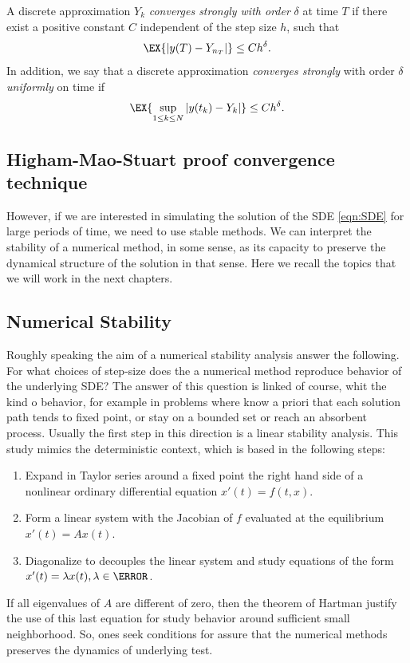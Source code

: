 \begin{definition}[order]
	A discrete approximation $Y_k$ \emph{converges strongly with order} $\delta$ at time $T$ if there exist a positive 
	constant $C$ independent of the step size $h$, such that
	\begin{equation}
	\EX{|y(T)-Y_{n_T}|} \leq C h^\delta.
	\end{equation}
	In addition, we say that a discrete approximation \emph{converges strongly} with order $\delta$ \emph{uniformly} on
	 time if
	\begin{equation}
	\EX{
		\sup_{1 \leq k\leq N}
		|y(t_k)-Y_k|
	}\leq C h^{\delta}.
	\end{equation}
\end{definition}


\subsection{Higham-Mao-Stuart proof convergence technique}
	
	However, if we are interested in simulating the  solution of the SDE \eqref{eqn:SDE} for large periods of time, 
	we need to use stable methods. We can interpret the stability of a numerical method, in some sense, as its
	capacity to preserve the  dynamical structure of the solution in that sense. Here we recall the topics that we will 
	work in the next chapters.
\subsection{Numerical Stability}
		Roughly speaking the aim of a numerical stability analysis answer the following.
	For what choices of step-size does the a numerical method reproduce behavior of the underlying SDE?
	The answer of this question is linked of course, whit the kind o behavior, for example in problems where know a 
	priori that	each solution path tends to fixed point, or stay on a bounded set or reach an absorbent process.
	Usually the first step in this direction is a linear stability analysis. This study mimics the deterministic 
	context, which is based in the following steps:
	\begin{enumerate}
		\item 
			Expand in Taylor series around a fixed point the right hand side of a nonlinear ordinary differential 
			equation $x'(t) = f(t,x)$.
		\item
			Form a linear system with the Jacobian of $f$ evaluated at the equilibrium
			$x'(t) = Ax(t)$.
		\item
			Diagonalize to decouples the linear system and study equations of the form
			$x'(t) = \lambda x(t), \lambda \in \C$.
	\end{enumerate}
	If all eigenvalues of $A$ are different of zero, then the  theorem of Hartman justify the use of this last equation 
	for study behavior around sufficient small neighborhood. So, ones 
	seek conditions for assure that the numerical methods preserves the dynamics of underlying test. 
		
